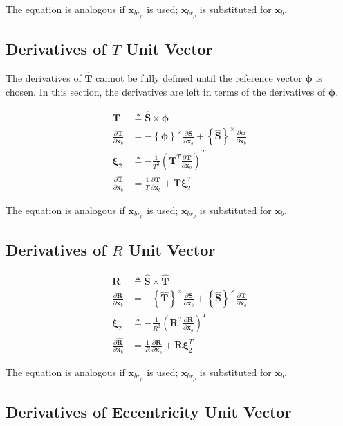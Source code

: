 \documentclass[]{article}
\newcommand{\vb}[1]{\bm{#1}} %
\newcommand{\vbh}[1]{\hat{\bm{#1}}} %
\newcommand{\pd}[2]{\frac{\partial #1}{\partial #2}} %
\newcommand{\crossmat}[1]{\left\{ {#1} \right\}^{\times}} %
\newcommand{\xb}[0]{\vb{x}_b}
\newcommand{\xbrp}[0]{\vb{x}_{br_p}}
\begin{document}
The equation is analogous if $\xbrp$ is used; $\xbrp$ is substituted for $\xb$.

\subsection{Derivatives of $T$ Unit Vector}

The derivatives of $\vbh{T}$ cannot be fully defined until the reference vector $\vb{\phi}$ is chosen. In this section, the derivatives are left in terms of the derivatives of $\vb{\phi}$.

\begin{align}
	\vb{T} &\triangleq \vbh{S} \times \vb{\phi} \\
	\pd{\vb{T}}{\xb} &= -\crossmat{\vb{\phi}} \pd{\vbh{S}}{\xb} + \crossmat{\vbh{S}} \pd{\vb{\phi}}{\xb} \\
	\vb{\xi}_2 &\triangleq -\frac{1}{T^3} \left( \vb{T}^T \pd{\vb{T}}{\xb} \right)^T \\
	\pd{\vbh{T}}{\xb} &= \frac{1}{T} \pd{\vb{T}}{\xb} + \vb{T} \vb{\xi}_2^T
\end{align}

The equation is analogous if $\xbrp$ is used; $\xbrp$ is substituted for $\xb$.

\subsection{Derivatives of $R$ Unit Vector}

\begin{align}
	\vb{R} &\triangleq \vbh{S} \times \vbh{T} \\
	\pd{\vb{R}}{\xb} &= -\crossmat{\vbh{T}} \pd{\vbh{S}}{\xb} + \crossmat{\vbh{S}} \pd{\vbh{T}}{\xb} \\
	\vb{\xi}_2 &\triangleq -\frac{1}{R^3} \left( \vb{R}^T \pd{\vb{R}}{\xb} \right)^T \\
	\pd{\vbh{R}}{\xb} &= \frac{1}{R} \pd{\vb{R}}{\xb} + \vb{R} \vb{\xi}_2^T
\end{align}

The equation is analogous if $\xbrp$ is used; $\xbrp$ is substituted for $\xb$.

\subsection{Derivatives of Eccentricity Unit Vector}
\end{document}
